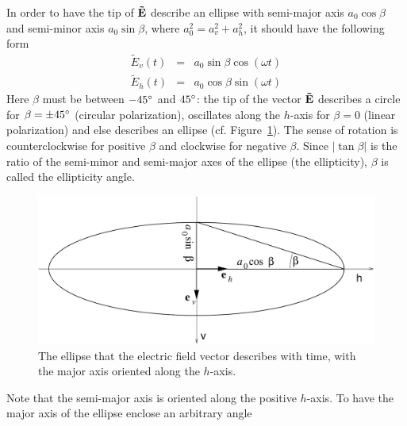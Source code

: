 In order to have the tip of $\mathbf{\tilde{E}}$ describe an ellipse with semi-major axis $a_0 \cos\beta$
and
semi-minor axis $a_0 \sin\beta$, where $a_0^2 = a_v^2 + a_h^2$, 
it should have the following form
\begin{eqnarray}
  \label{eq:polarization:ellipse_parallel}
 \tilde{E}_v (t) &=&   a_0 \sin\beta \cos(\omega t)\\
 \tilde{E}_h (t) &=&   a_0 \cos\beta \sin(\omega t)
\end{eqnarray}
Here $\beta$ must be between $-45^\circ$ and $45^\circ$: the tip of
the vector $\mathbf{\tilde{E}}$ describes a circle for $\beta = \pm
45^\circ$ (circular polarization), oscillates along the $h$-axis for
$\beta = 0$ (linear polarization) and else describes an ellipse (cf.
Figure~\ref{fig:polarization:ellipse_aligned}). The sense of rotation
is counterclockwise for positive $\beta$ and clockwise for negative
$\beta$.
Since $|\tan\beta|$ is the ratio of the semi-minor and semi-major axes
of the ellipse (the ellipticity), $\beta$ is called the ellipticity
angle.
\begin{figure}[!h]
 \begin{center}
  \begin{minipage}[c]{0.9\textwidth}
   \begin{center}
    \includegraphics*[width=0.9\hsize]{Figs/pol_ellipse_aligned}
   \end{center}
  \end{minipage}
  \begin{minipage}[c]{0.9\textwidth}
   \caption{The ellipse that the electric field vector describes with
     time, with the major axis oriented along the $h$-axis.}
   \label{fig:polarization:ellipse_aligned}
  \end{minipage}
 \end{center}
\end{figure}   
Note that the semi-major axis is oriented along the positive $h$-axis.
To have the major axis of the ellipse enclose an arbitrary angle
